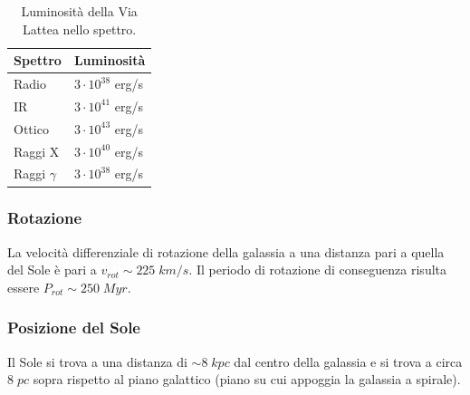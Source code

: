 \begin{table}[!ht]
    \caption{Luminosità della Via Lattea nello spettro.}
    \label{tab:luminosita-via-lattea}
    \centering
    \begin{tabular}{ll}
    \toprule
    Spettro &  Luminosità \\
    \midrule
    Radio & $3 \cdot 10^{38}$ \si{erg}/\si{s}\\
    IR & $3 \cdot 10^{41}$ \si{erg}/\si{s}\\
    Ottico & $3 \cdot 10^{43}$ \si{erg}/\si{s}\\
    Raggi X & $3 \cdot 10^{40}$ \si{erg}/\si{s}\\
    Raggi $\gamma$ & $3 \cdot 10^{38}$ \si{erg}/\si{s}\\
    \bottomrule
    \end{tabular}
\end{table}

\subsubsection{Rotazione}
La velocità differenziale di rotazione della galassia a una distanza pari a quella del Sole è pari a $v_{rot} \sim 225 \;\si{km}/\si{s}$. Il periodo di rotazione di conseguenza risulta essere $P_{rot} \sim 250 \; \si{Myr}$.

\subsubsection{Posizione del Sole}
Il Sole si trova a una distanza di $\sim 8 \;\si{kpc}$ dal centro della galassia e si trova a circa $8 \;\si{pc}$ sopra rispetto al piano galattico (piano su cui appoggia la galassia a spirale).

